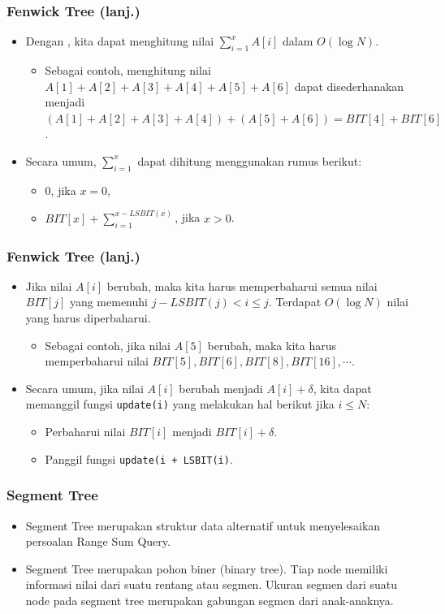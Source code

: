 \begin{frame}
\frametitle{Fenwick Tree (lanj.)}
\begin{itemize}
  \item Dengan \ffenwickTree, kita dapat menghitung nilai $\sum_{i=1}^{x} A[i]$ dalam $O(\log N)$.
  \begin{itemize}
    \item Sebagai contoh, menghitung nilai $A[1] + A[2] + A[3] + A[4] + A[5] + A[6]$ dapat disederhanakan menjadi $(A[1] + A[2] + A[3] + A[4]) + (A[5] + A[6]) = BIT[4] + BIT[6]$.
  \end{itemize}
  \item Secara umum, $\sum_{i=1}^{x}$ dapat dihitung menggunakan rumus berikut:
  \begin{itemize}
    \item $0$, jika $x = 0$,
    \item $BIT[x] + \sum_{i=1}^{x - LSBIT(x)}$, jika $x > 0$.
  \end{itemize}
\end{itemize}
\end{frame}

\begin{frame}
\frametitle{Fenwick Tree (lanj.)}
\begin{itemize}
  \item Jika nilai $A[i]$ berubah, maka kita harus memperbaharui semua nilai $BIT[j]$ yang memenuhi $j - LSBIT(j) < i \leq j$. Terdapat $O(\log N)$ nilai yang harus diperbaharui.
  \begin{itemize}
    \item Sebagai contoh, jika nilai $A[5]$ berubah, maka kita harus memperbaharui nilai $BIT[5], BIT[6], BIT[8], BIT[16], \cdots$.
  \end{itemize}
  \item Secara umum, jika nilai $A[i]$ berubah menjadi $A[i] + \delta$, kita dapat memanggil fungsi \lstinline{update(i)} yang melakukan hal berikut jika $i \leq N$:
  \begin{itemize}
    \item Perbaharui nilai $BIT[i]$ menjadi $BIT[i] + \delta$.
    \item Panggil fungsi \lstinline{update(i + LSBIT(i)}.
  \end{itemize}
\end{itemize}
\end{frame}

\begin{frame}
\frametitle{Segment Tree}
\begin{itemize}
  \item Segment Tree merupakan struktur data alternatif untuk menyelesaikan persoalan Range Sum Query.
  \item Segment Tree merupakan pohon biner (binary tree). Tiap node memiliki informasi nilai dari suatu rentang atau segmen. Ukuran segmen dari suatu node pada segment tree merupakan gabungan segmen dari anak-anaknya.
\end{itemize}
\end{frame}

